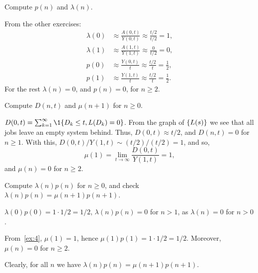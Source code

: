 \begin{exercise} \label{ex:113} 
Compute
$p(n)$ and $\lambda(n)$.
\begin{solution}
 From the other exercises:
 \begin{align*}
 \lambda(0) &\approx \frac{A(0,t)}{Y(0,t)} \approx \frac{t/2}{t/2} = 1, \\
 \lambda(1) &\approx \frac{A(1,t)}{Y(1,t)} \approx \frac{0}{t/2} = 0, \\
 p(0) &\approx \frac{Y(0,t)}{t} \approx \frac{t/2}{t} = \frac 1 2, \\
 p(1) &\approx \frac{Y(1,t)}{t} \approx \frac{t/2}{t} = \frac 1 2.
 \end{align*}
For the rest $\lambda(n) = 0$, and $p(n)=0$, for $n\geq 2$.
\end{solution}
\end{exercise}


\begin{exercise}\label{ex:4}
Compute
$D(n,t)$ and $\mu(n+1)$ for $n\geq 0$.
\begin{solution}
 $D(0,t) = \sum_{k=1}^\infty\1{D_k\leq t, L(D_k)=0}$. From the graph of $\{L(s)\}$ we see that all jobs leave an empty system behind. Thus, $D(0,t) \approx t/2$, and $D(n,t)=0$ for $n\geq 1$. With this, $D(0,t)/Y(1,t) \sim (t/2)/(t/2) = 1$, and so,
 \begin{equation*}
 \mu(1) = \lim_{t\to\infty} \frac{D(0,t)}{Y(1, t)} = 1,
 \end{equation*}
and $\mu(n) = 0$ for $n\geq2$. 
\end{solution}
\end{exercise}



\begin{exercise}\label{ex:l-110}
 Compute $\lambda(n) p(n)$ for $n\geq 0$, and check $\lambda(n) p(n) = \mu(n+1) p(n+1)$.
\begin{solution}
 $\lambda(0)p(0)=1\cdot 1/2 = 1/2$, $\lambda(n)p(n)= 0$ for $n>1$, as $\lambda(n)=0$ for $n>0$.

From~\cref{ex:4}, $\mu(1)=1$, hence $\mu(1) p(1) = 1\cdot 1/2 = 1/2$. Moreover, $\mu(n)=0$ for $n\geq 2$. 

Clearly, for all $n$ we have $\lambda(n)p(n)= \mu(n+1)p(n+1)$. 

\end{solution}
\end{exercise}


